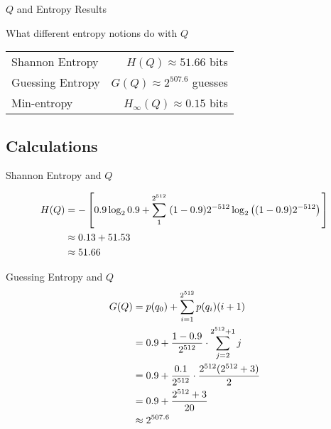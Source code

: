\documentclass[xcolor={dvipsnames,table}]{beamer}
\begin{document}
\begin{frame}{\(Q\) and Entropy Results}
\begin{center}\large
What different entropy notions do with $Q$
\begin{tabular}{|lr|}
\hline
Shannon Entropy & $H(Q) \approx 51.66$ bits \\
Guessing Entropy &$G(Q) \approx 2^{507.6}$ guesses \\
Min-entropy &$H_\infty(Q) \approx 0.15$ bits \\
\hline
\end{tabular}
\end{center}
\end{frame}

\subsection{Calculations}

\begin{frame}{Shannon Entropy and \(Q\) }

\begin{align}
H(Q) &= -\left[ 0.9\log_2 0.9
       + \sum_1^{2^{512}}\left. (1-0.9) 2^{-512}\log_2\left((1-0.9)2^{-512}\right)\right.\right]\notag \\
     &\approx  0.13 + 51.53\notag \\
     &\approx 51.66 \notag
\end{align}
\end{frame}

\begin{frame}{Guessing Entropy and \(Q\) }
\begin{align}
G(Q) &= p(q_0) + \sum_{i=1}^{2^{512}} p(q_i)(i+1) \notag \\
     & = 0.9 +  \frac{1-0.9}{2^{512}} \cdot \sum_{j=2}^{2^{512}+1}j \notag \\
     &= 0.9 + \frac{0.1}{2^{512}} \cdot \frac{2^{512}(2^{512} +3)}{2} \notag \\
     &= 0.9 + \frac{2^{512} + 3}{20}\notag \\
     &\approx 2^{507.6} \notag
\end{align}

\end{frame}

%
\end{document}
